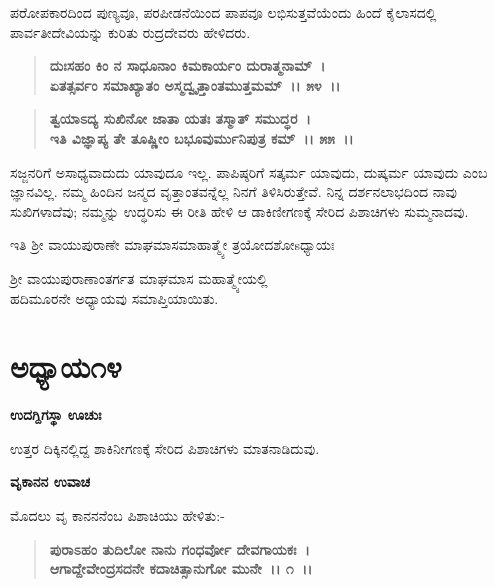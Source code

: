 ಪರೋಪಕಾರದಿಂದ ಪುಣ್ಯವೂ, ಪರಪೀಡನೆಯಿಂದ ಪಾಪವೂ ಲಭಿಸುತ್ತವೆಯೆಂದು ಹಿಂದೆ ಕೈಲಾಸದಲ್ಲಿ ಪಾರ್ವತೀದೇವಿಯನ್ನು ಕುರಿತು ರುದ್ರದೇವರು ಹೇಳಿದರು.

\begin{verse}
\textbf{ದುಃಸಹಂ ಕಿಂ ನ ಸಾಧೂನಾಂ ಕಿಮಕಾರ್ಯಂ ದುರಾತ್ಮನಾಮ್~।}\\\textbf{ಏತತ್ಸರ್ವಂ ಸಮಾಖ್ಯಾತಂ ಅಸ್ಮದ್ವೃತ್ತಾಂತಮುತ್ತಮಮ್~।। ೫೪~।। }
\end{verse}

\begin{verse}
\textbf{ತ್ವಯಾಽದ್ಯ ಸುಖಿನೋ ಜಾತಾ ಯತಃ ತಸ್ಮಾತ್ ಸಮುದ್ಧರ~।}\\\textbf{ಇತಿ ವಿಜ್ಞಾಪ್ಯ ತೇ ತೂಷ್ಣೀಂ ಬಭೂವುರ್ಮುನಿಪುತ್ರ ಕಮ್~।। ೫೫~।।}
\end{verse}

ಸಜ್ಜನರಿಗೆ ಅಸಾಧ್ಯವಾದುದು ಯಾವುದೂ ಇಲ್ಲ. ಪಾಪಿಷ್ಠರಿಗೆ ಸತ್ಕರ್ಮ ಯಾವುದು, ದುಷ್ಕರ್ಮ ಯಾವುದು ಎಂಬ ಜ್ಞಾನವಿಲ್ಲ. ನಮ್ಮ ಹಿಂದಿನ ಜನ್ಮದ ವೃತ್ತಾಂತವನ್ನೆಲ್ಲ ನಿನಗೆ ತಿಳಿಸಿರುತ್ತೇವೆ. ನಿನ್ನ ದರ್ಶನಲಾಭದಿಂದ ನಾವು ಸುಖಿಗಳಾದೆವು; ನಮ್ಮನ್ನು ಉದ್ಧರಿಸು ಈ ರೀತಿ ಹೇಳಿ ಆ ಡಾಕಿಣೀಗಣಕ್ಕೆ ಸೇರಿದ ಪಿಶಾಚಿಗಳು ಸುಮ್ಮನಾದವು.

\begin{center}
ಇತಿ ಶ‍್ರೀ ವಾಯುಪುರಾಣೇ ಮಾಘಮಾಸಮಾಹಾತ್ಮ್ಯೇ ತ್ರಯೋದಶೋsಧ್ಯಾಯಃ 
\end{center}

\begin{center}
ಶ‍್ರೀ ವಾಯುಪುರಾಣಾಂತರ್ಗತ ಮಾಘಮಾಸ ಮಹಾತ್ಮ್ಯೇಯಲ್ಲಿ\\ ಹದಿಮೂರನೇ ಅಧ್ಯಾಯವು ಸಮಾಪ್ತಿಯಾಯಿತು.
\end{center}

\newpage

\section*{ಅಧ್ಯಾಯ\enginline{-}೧೪}

\begin{flushleft}
\textbf{ಉದಗ್ದಿಗಸ್ಥಾ ಊಚುಃ\enginline{-}}
\end{flushleft}

ಉತ್ತರ ದಿಕ್ಕಿನಲ್ಲಿದ್ದ ಶಾಕಿನೀಗಣಕ್ಕೆ ಸೇರಿದ ಪಿಶಾಚಿಗಳು ಮಾತನಾಡಿದುವು.

\begin{flushleft}
\textbf{ವೃಕಾನನ ಉವಾಚ\enginline{-}}
\end{flushleft}

ಮೊದಲು ವೃ ಕಾನನನೆಂಬ ಪಿಶಾಚಿಯು ಹೇಳಿತು:-

\begin{verse}
\textbf{ಪುರಾಽಹಂ ತುದಿಲೋ ನಾನು ಗಂಧರ್ವೋ ದೇವಗಾಯಕಃ~।}\\\textbf{ಆಗಾದ್ದೇವೇಂದ್ರಸದನೇ ಕದಾಚಿತ್ಸಾನುಗೋ ಮುನೇ~।। ೧~।। }
\end{verse}

